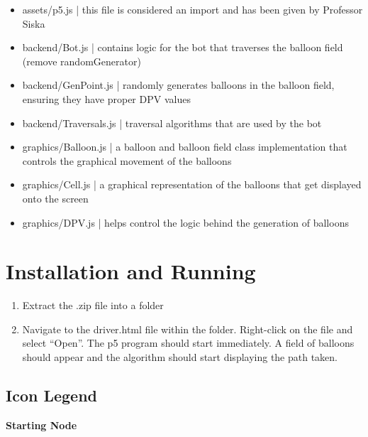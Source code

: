 \documentclass{article}
\begin{document}
\begin{itemize}
\item assets/p5.js | this file is considered an import and has been given by Professor Siska
\item backend/Bot.js | contains logic for the bot that traverses the balloon field (remove randomGenerator)
\item backend/GenPoint.js | randomly generates balloons in the balloon field, ensuring they have proper DPV values
\item backend/Traversals.js | traversal algorithms that are used by the bot
\item graphics/Balloon.js | a balloon and balloon field class implementation that controls the graphical movement of the balloons
\item graphics/Cell.js | a graphical representation of the balloons that get displayed onto the screen
\item graphics/DPV.js | helps control the logic behind the generation of balloons
\end{itemize}

\newpage

\section{Installation and Running}

\begin{enumerate}
\item Extract the .zip file into a folder
\item Navigate to the driver.html file within the folder. Right-click on the file and select “Open”. The p5 program should start immediately. A field of balloons should appear and the algorithm should start displaying the path taken.
\end{enumerate}

\subsection{Icon Legend}

\begin{center}
\large \textbf{Starting Node}


\end{center}
\end{document}
